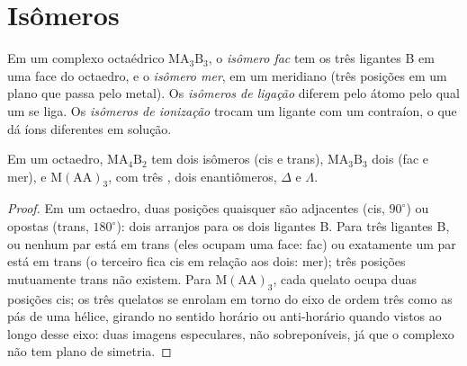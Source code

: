 \section{Isômeros}

\begin{definition}\label{def:b2:coordination-complexes:isomers}
Em um complexo octaédrico $\mathrm{MA_3B_3}$, o \emph{isômero fac} tem
os três ligantes B em uma face do octaedro, e o \emph{isômero
mer}, em um meridiano (três posições em um plano que passa
pelo metal). Os \emph{isômeros de ligação} diferem
pelo átomo pelo qual um  se liga. Os \emph{isômeros de
ionização} trocam um ligante com um contraíon, o
que dá íons diferentes em solução.
\end{definition}

\begin{proposition}\label{prop:b2:coordination-complexes:isomer-count}
Em um octaedro, $\mathrm{MA_4B_2}$ tem dois isômeros (cis e trans), $\mathrm{MA_3B_3}$ dois
(fac e mer), e $\mathrm M(\mathrm{AA})_3$, com três , dois
enantiômeros, $\Delta$ e $\Lambda$.
\end{proposition}

\begin{proof}
Em um octaedro, duas posições quaisquer são adjacentes (cis, $90^\circ$) ou opostas
(trans, $180^\circ$): dois arranjos para os dois ligantes B. Para três ligantes B,
ou nenhum par está em trans (eles ocupam uma face: fac) ou exatamente um par
está em trans (o terceiro fica cis em relação aos dois: mer); três posições
mutuamente trans não existem. Para
$\mathrm M(\mathrm{AA})_3$, cada quelato ocupa duas posições cis; os três quelatos
se enrolam em torno do eixo de ordem três como as pás de uma hélice, girando
no sentido horário ou anti-horário quando vistos ao longo desse eixo: duas
imagens especulares, não sobreponíveis, já que o complexo não tem plano de
simetria.
\end{proof}

